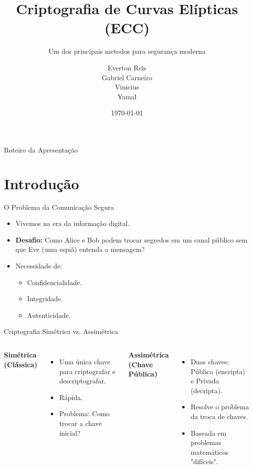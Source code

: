 \documentclass[aspectratio=169]{beamer}
\title[Curvas Elípticas e Criptografia]{Criptografia de Curvas Elípticas (ECC)}
\subtitle{Um dos princípais metodos para segurança moderna}
\author{Everton Reis \\ Gabriel Carneiro \\ Vinicius \\ Yamal}
\institute[FGV - EMAP]{EMAP \\ FGV}
\date{\today}
\begin{document}
\begin{frame}
  \titlepage
\end{frame}

\begin{frame}{Roteiro da Apresentação}
  \tableofcontents
\end{frame}

\section{Introdução}

\begin{frame}{O Problema da Comunicação Segura}
  \begin{itemize}
      \item Vivemos na era da informação digital.
      \item \textbf{Desafio:} Como Alice e Bob podem trocar segredos em um canal público sem que Eve (uma espiã) entenda a mensagem?
      \item Necessidade de:
      \begin{itemize}
          \item Confidencialidade.
          \item Integridade.
          \item Autenticidade.
      \end{itemize}
  \end{itemize}
\end{frame}

\begin{frame}{Criptografia Simétrica vs. Assimétrica}
  \begin{columns}
      \textbf{Simétrica (Clássica)}
      \begin{itemize}
          \item Uma única chave para criptografar e descriptografar.
          \item Rápida.
          \item \alert{Problema:} Como trocar a chave inicial?
      \end{itemize}
      
      \textbf{Assimétrica (Chave Pública)}
      \begin{itemize}
          \item Duas chaves: Pública (encripta) e Privada (decripta).
          \item Resolve o problema da troca de chaves.
          \item Baseada em problemas matemáticos "difíceis".
      \end{itemize}
  \end{columns}
\end{frame}
\end{document}
